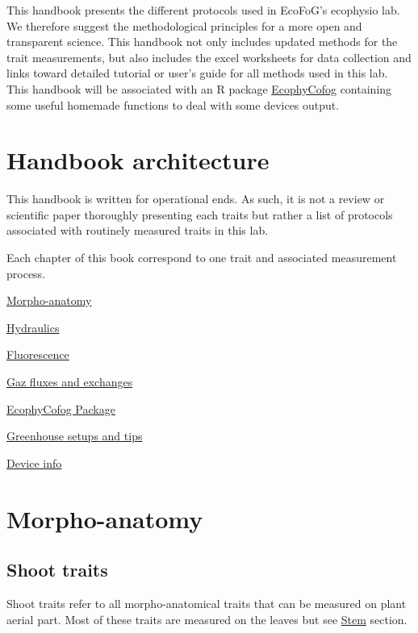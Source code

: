 \documentclass[
  12pt,
  american,
  a4paper,
  extrafontsizes,onecolumn,openright
  ]{memoir}
\begin{document}
This handbook presents the different protocols used in EcoFoG's ecophysio lab.
We therefore suggest the methodological principles for a more open and transparent science.
This handbook not only includes updated methods for the trait measurements, but also includes the excel worksheets for data collection and links toward detailed tutorial or user's guide for all methods used in this lab.
This handbook will be associated with an R package \protect\hyperlink{ecophycofog-package}{EcophyCofog} containing some useful homemade functions to deal with some devices output.

\mainmatter

\hypertarget{handbook-architecture}{%
\chapter{Handbook architecture}\label{handbook-architecture}}

This handbook is written for operational ends. As such, it is not a review or scientific paper thoroughly presenting each traits but rather a list of protocols associated with routinely measured traits in this lab.

Each chapter of this book correspond to one trait and associated measurement process.

\protect\hyperlink{morpho-anatomy}{Morpho-anatomy}

\protect\hyperlink{hydraulics}{Hydraulics}

\protect\hyperlink{fluorescence}{Fluorescence}

\protect\hyperlink{gaz-fluxes-and-exchanges}{Gaz fluxes and exchanges}

\protect\hyperlink{ecophycofog-package}{EcophyCofog Package}

\protect\hyperlink{greenhouse-setups-and-tips}{Greenhouse setups and tips}

\protect\hyperlink{device-info}{Device info}

\hypertarget{morpho-anatomy}{%
\chapter{Morpho-anatomy}\label{morpho-anatomy}}

\hypertarget{shoot-traits}{%
\section{Shoot traits}\label{shoot-traits}}

Shoot traits refer to all morpho-anatomical traits that can be measured on plant aerial part.
Most of these traits are measured on the leaves but see \protect\hyperlink{stem}{Stem} section.
\end{document}
